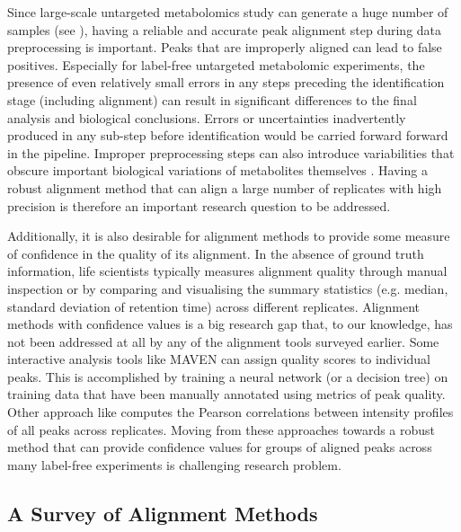 Since large-scale untargeted metabolomics study can generate a huge number of samples (see \cite{DeVos2007a,Creek2011}), having a reliable and accurate peak alignment step during data preprocessing is important. Peaks that are improperly aligned can lead to false positives. Especially for label-free untargeted metabolomic experiments, the presence of even relatively small errors in any steps preceding the identification stage (including alignment) can result in significant differences to the final analysis and biological conclusions. Errors or uncertainties inadvertently produced in any sub-step before identification would be carried forward forward in the pipeline. Improper preprocessing steps can also introduce variabilities that obscure important biological variations of metabolites themselves \cite{Katajamaa2007}. Having a robust alignment method that can align a large number of replicates with high precision is therefore an important research question to be addressed.

Additionally, it is also desirable for alignment methods to provide some measure of confidence in the quality of its alignment. In the absence of ground truth information, life scientists typically measures alignment quality through manual inspection or by comparing and visualising the summary statistics (e.g. median, standard deviation of retention time) across different replicates. Alignment methods with confidence values is a big research gap that, to our knowledge, has not been addressed at all by any of the alignment tools surveyed earlier. Some interactive analysis tools like MAVEN \cite{Melamud2010} can assign quality scores to individual peaks. This is accomplished by training a neural network (or a decision tree) on training data that have been manually annotated using metrics of peak quality. Other approach like \cite{Brodsky2010} computes the Pearson correlations between intensity profiles of all peaks across replicates. Moving from these approaches towards a robust method that can provide confidence values for groups of aligned peaks across many label-free experiments is challenging research problem.

\subsection{\label{sub:Approaches-in-Peak}A Survey of Alignment Methods}

